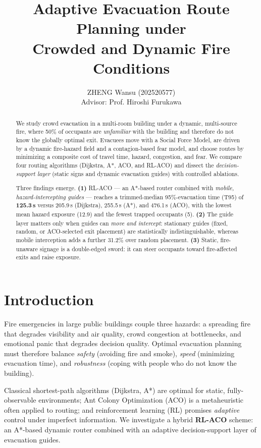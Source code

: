 \documentclass[11pt,a4paper]{article}
\title{\bfseries Adaptive Evacuation Route Planning under\\ Crowded and Dynamic Fire Conditions}
\author{ZHENG Wansu (202520577)\\ Advisor: Prof. Hiroshi Furukawa}
\date{}
\begin{document}
\maketitle

\begin{abstract}
\noindent
We study crowd evacuation in a multi-room building under a dynamic, multi-source fire, where 50\%
of occupants are \emph{unfamiliar} with the building and therefore do not know the globally
optimal exit. Evacuees move with a Social Force Model, are driven by a dynamic fire-hazard field
and a contagion-based fear model, and choose routes by minimizing a composite cost of travel time,
hazard, congestion, and fear. We compare four routing algorithms (Dijkstra, A*, ACO, and RL-ACO)
and dissect the \emph{decision-support layer} (static signs and dynamic evacuation guides) with
controlled ablations.

Three findings emerge. \textbf{(1)} RL-ACO --- an A*-based router combined with \emph{mobile,
hazard-intercepting guides} --- reaches a trimmed-median 95\%-evacuation time (T95) of
\textbf{125.3\,s} versus 205.9\,s (Dijkstra), 255.5\,s (A*), and 476.1\,s (ACO), with the lowest
mean hazard exposure (12.9) and the fewest trapped occupants (5). \textbf{(2)} The guide layer
matters only when guides can \emph{move and intercept}: stationary guides (fixed, random, or
ACO-selected exit placement) are statistically indistinguishable, whereas mobile interception
adds a further 31.2\% over random placement. \textbf{(3)} Static, fire-unaware signage is a
double-edged sword: it can steer occupants toward fire-affected exits and raise exposure.
\end{abstract}

\section{Introduction}

Fire emergencies in large public buildings couple three hazards: a spreading fire that degrades
visibility and air quality, crowd congestion at bottlenecks, and emotional panic that degrades
decision quality. Optimal evacuation planning must therefore balance \emph{safety} (avoiding fire
and smoke), \emph{speed} (minimizing evacuation time), and \emph{robustness} (coping with people
who do not know the building).

Classical shortest-path algorithms (Dijkstra, A*) are optimal for static, fully-observable
environments; Ant Colony Optimization (ACO) is a metaheuristic often applied to routing; and
reinforcement learning (RL) promises \emph{adaptive} control under imperfect information. We
investigate a hybrid \textbf{RL-ACO} scheme: an A*-based dynamic router combined with an adaptive
decision-support layer of evacuation guides.
\end{document}
